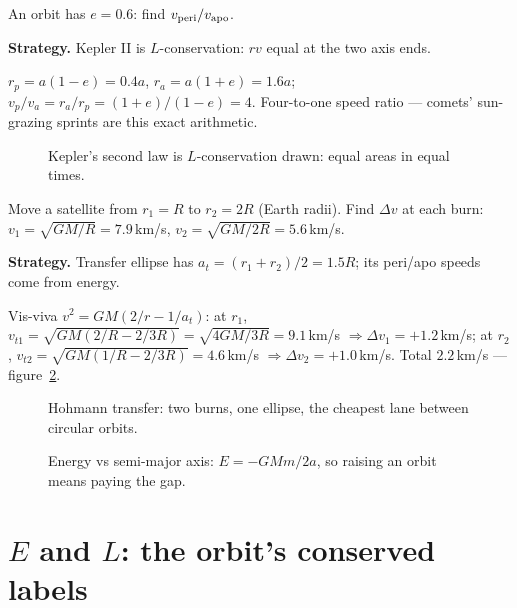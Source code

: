 \begin{example}\label{ex:kepler2}
An orbit has $e=0.6$: find $v_{\rm peri}/v_{\rm apo}$.
\par\smallskip
\textbf{Strategy.} Kepler II is $L$-conservation: $rv$ equal at the two
axis ends.
\begin{solution}
$r_p=a(1-e)=0.4a$, $r_a=a(1+e)=1.6a$;
$v_p/v_a=r_a/r_p=(1+e)/(1-e)=4$. Four-to-one speed ratio --- comets'
sun-grazing sprints are this exact arithmetic. \checkmark
\end{solution}
\end{example}

\begin{figure}[htbp]\centering

\caption{Kepler's second law is $L$-conservation drawn: equal areas in
equal times.}
\label{fig:kepler}
\end{figure}

\begin{example}\label{ex:hohmann}
Move a satellite from $r_1=R$ to $r_2=2R$ (Earth radii). Find $\Delta v$
at each burn: $v_1=\sqrt{GM/R}=7.9$\,km/s, $v_2=\sqrt{GM/2R}=5.6$\,km/s.
\par\smallskip
\textbf{Strategy.} Transfer ellipse has $a_t=(r_1+r_2)/2=1.5R$; its
peri/apo speeds come from energy.
\begin{solution}
Vis-viva $v^{2}=GM(2/r-1/a_t)$: at $r_1$,
$v_{t1}=\sqrt{GM(2/R-2/3R)}=\sqrt{4GM/3R}=9.1$\,km/s
$\Rightarrow\Delta v_1=+1.2$\,km/s; at $r_2$,
$v_{t2}=\sqrt{GM(1/R-2/3R)}=4.6$\,km/s
$\Rightarrow\Delta v_2=+1.0$\,km/s. Total $2.2$\,km/s ---
figure~\ref{fig:hohmann}. \checkmark
\end{solution}
\end{example}

\begin{figure}[htbp]\centering

\caption{Hohmann transfer: two burns, one ellipse, the cheapest lane
between circular orbits.}
\label{fig:hohmann}
\end{figure}

\begin{figure}[htbp]\centering

\caption{Energy vs semi-major axis: $E=-GMm/2a$, so raising an orbit
means paying the gap.}
\label{fig:ea}
\end{figure}

\section{$E$ and $L$: the orbit's conserved labels}\label{sec:grav-cons}

